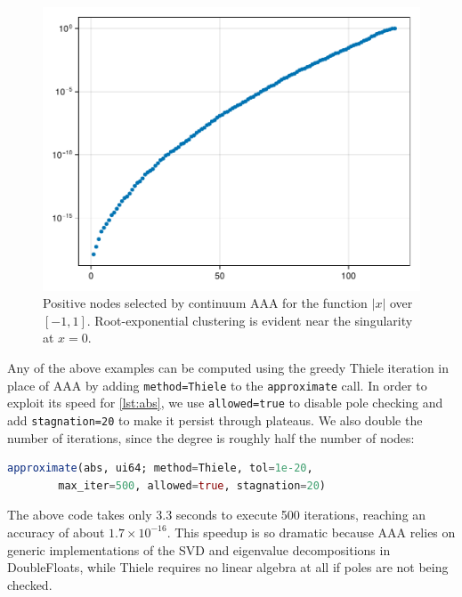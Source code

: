 \documentclass{juliacon}
\begin{document}
\begin{figure}
\centering
\includegraphics[width=\columnwidth]{absnodes.pdf}
\caption{Positive nodes selected by continuum AAA for the function $|x|$ over $[-1,1]$. Root-exponential clustering is evident near the singularity at $x=0$.}
\label{fig:absnodes}
\end{figure}

Any of the above examples can be computed using the greedy Thiele iteration in place of AAA by adding \verb|method=Thiele| to the \verb|approximate| call. In order to exploit its speed for \autoref{lst:abs}, we use \verb|allowed=true| to disable pole checking and add \verb|stagnation=20| to make it persist through plateaus. We also double the number of iterations, since the degree is roughly half the number of nodes:
\begin{lstlisting}[language = Julia, caption={Continuum Thiele for $|x|$.}]
approximate(abs, ui64; method=Thiele, tol=1e-20, 
        max_iter=500, allowed=true, stagnation=20)
\end{lstlisting}
The above code takes only 3.3 seconds to execute 500 iterations, reaching an accuracy of about $1.7\times10^{-16}$. This speedup is so dramatic because AAA relies on generic implementations of the SVD and eigenvalue decompositions in \textsf{DoubleFloats}, while Thiele requires no linear algebra at all if poles are not being checked.
\end{document}
